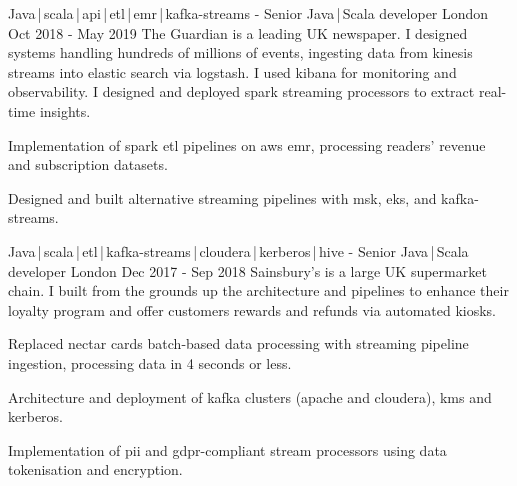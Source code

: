 \begin{cventries}
    \cventry
    {Java\,|\,scala\,|\,api\,|\,etl\,|\,emr\,|\,kafka-streams}
    { - Senior Java\,|\,Scala developer}
    {London}
    {Oct 2018 - May 2019}
    {The Guardian is a leading UK newspaper. I designed systems handling hundreds of millions of events, ingesting data from kinesis streams into elastic search via logstash. I used kibana for monitoring and observability. I designed and deployed spark streaming processors to extract real-time insights.}
    {
        \begin{cvitems}
            \item{Implementation of spark etl pipelines on aws emr, processing readers' revenue and subscription datasets.}
            \item{Designed and built alternative streaming pipelines with msk, eks, and kafka-streams.}
        \end{cvitems}
    }

    \cventry
    {Java\,|\,scala\,|\,etl\,|\,kafka-streams\,|\,cloudera\,|\,kerberos\,|\,hive}
    { - Senior Java\,|\,Scala developer}
    {London}
    {Dec 2017 - Sep 2018}
    {Sainsbury's is a large UK supermarket chain. I built from the grounds up the architecture and pipelines to enhance their loyalty program and offer customers rewards and refunds via automated kiosks.}
    {
        \begin{cvitems}
            \item{Replaced nectar cards batch-based data processing with streaming pipeline ingestion, processing data in 4 seconds or less.}
            \item{Architecture and deployment of kafka clusters (apache and cloudera), kms and kerberos.}
            \item{Implementation of pii and gdpr-compliant stream processors using data tokenisation and encryption.}
        \end{cvitems}
    }


\end{cventries}
